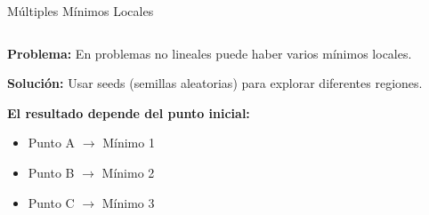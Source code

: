\documentclass{beamer}
\begin{document}
\begin{frame}{Múltiples Mínimos Locales}
    \begin{columns}
        \begin{column}{0.6\textwidth}
            \textbf{Problema:} En problemas no lineales puede haber varios mínimos locales.
            
            \vspace{0.3cm}
            
            \textbf{Solución:} Usar seeds (semillas aleatorias) para explorar diferentes regiones.
            
            \vspace{0.3cm}
            
            \textbf{El resultado depende del punto inicial:}
            \begin{itemize}
                \item Punto A $\rightarrow$ Mínimo 1
                \item Punto B $\rightarrow$ Mínimo 2
                \item Punto C $\rightarrow$ Mínimo 3
            \end{itemize}
        \end{column}
        \begin{column}{0.4\textwidth}
            \centering
        \end{column}
    \end{columns}
\end{frame}
\end{document}
